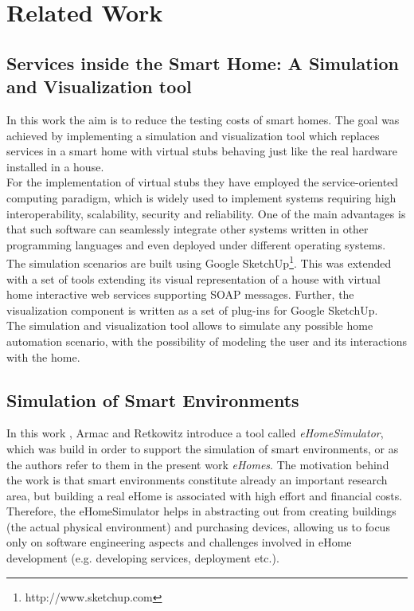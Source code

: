 \chapter{Related Work}\label{ch:related_work}

\section{Services inside the Smart Home: A Simulation and Visualization tool}\label{sec:services_in_smart_homes}

In this work \cite{lazovik2009services} the aim is to reduce the testing costs of smart homes. The goal was achieved by implementing a simulation and visualization tool which replaces services in a smart home with virtual stubs behaving just like the real hardware installed in a house.\\

For the implementation of virtual stubs they have employed the service-oriented computing paradigm, which is widely used to implement systems requiring high interoperability, scalability, security and reliability. One of the main advantages is that such software can seamlessly integrate other systems written in other programming languages and even deployed under different operating systems.\\

The simulation scenarios are built using Google SketchUp\footnote{http://www.sketchup.com}. This was extended with a set of tools extending its visual representation of a house with virtual home interactive web services supporting SOAP messages. Further, the visualization component is written as a set of plug-ins for Google SketchUp.\\

The simulation and visualization tool allows to simulate any possible home automation scenario, with the possibility of modeling the user and its interactions with the home.

\section{Simulation of Smart Environments}\label{sec:sim_of_smart_envs}

In this work \cite{armac2007simulation}, Armac and Retkowitz introduce a tool called \emph{eHomeSimulator}, which was build in order to support the simulation of smart environments, or as the authors refer to them in the present work \emph{eHomes}. The motivation behind the work is that smart environments constitute already an important research area, but building a real eHome is associated with high effort and financial costs. Therefore, the eHomeSimulator helps in abstracting out from creating buildings (the actual physical environment) and purchasing devices, allowing us to focus only on software engineering aspects and challenges involved in eHome development (e.g. developing services, deployment etc.).\\

